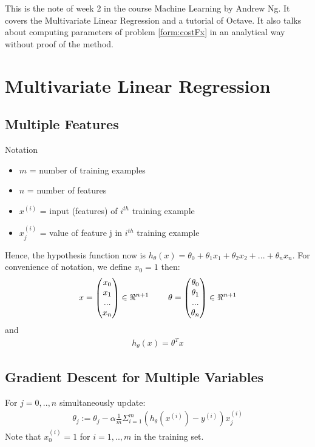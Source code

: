 This is the note of week 2 in the course Machine Learning by Andrew Ng. It covers the Multivariate Linear Regression and a tutorial of Octave. It also talks about computing parameters of problem \eqref{form:costFx} in an analytical way without proof of the method. 

\section{Multivariate Linear Regression}
\subsection{Multiple Features}
Notation
\begin{itemize}
 	\item $m$ = number of training examples
 	\item $n$ = number of features
 	\item $x^{(i)}$ = input (features) of $i^{th}$ training example
 	\item $x_{j}^{(i)}$ = value of feature j in $i^{th}$ training example
 \end{itemize} 

Hence, the hypothesis function now is $h_{\theta}(x) = \theta_0 + \theta_1 x_1 + \theta_2 x_2 + ... + \theta_n x_n$. For convenience of notation, we define $x_0 = 1$ then:
\[
x = \begin{pmatrix}
x_0 \\
x_1 \\
... \\
x_n
\end{pmatrix} \in \Re^{n+1} \hspace{0.8cm} \theta = \begin{pmatrix}
\theta_0 \\
\theta_1 \\
... \\
\theta_n
\end{pmatrix} \in \Re^{n+1}
\]   
and
\begin{align}
\label{form:w2mulVarH}
h_\theta(x) = \theta^{T}x
\end{align}

\subsection{Gradient Descent for Multiple Variables}
For $j = 0,..,n $ simultaneously update:
\begin{align}
\label{form:w2mulVarGradDesc}
\theta_j := \theta_j - \alpha \frac{1}{m} \Sigma_{i=1}^{m} (h_{\theta}(x^{(i)}) - y^{(i)})x_j^{(i)}  
\end{align}
Note that $x_0^{(i)} = 1$ for $i = 1,..,m$ in the training set.

